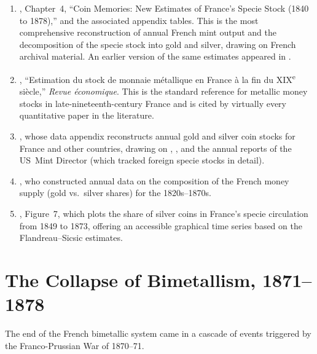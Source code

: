 \documentclass[12pt,letterpaper]{article}
\begin{document}
\begin{enumerate}
  \item \textbf{\citet{flandreau2004}}, Chapter~4, ``Coin Memories: New Estimates
  of France's Specie Stock (1840 to 1878),'' and the associated appendix tables.
  This is the most comprehensive reconstruction of annual French mint output and
  the decomposition of the specie stock into gold and silver, drawing on French
  archival material.  An earlier version of the same estimates appeared in
  \citet{flandreau1995}.

  \item \textbf{\citet{sicsic1989}}, ``Estimation du stock de monnaie m\'etallique
  en France \`a la fin du XIX\textsuperscript{e} si\`ecle,'' \textit{Revue
  \'economique}.  This is the standard reference for metallic money stocks in
  late-nineteenth-century France and is cited by virtually every quantitative
  paper in the literature.

  \item \textbf{\citet{velde_weber2000}}, whose data appendix reconstructs annual
  gold and silver coin stocks for France and other countries, drawing on
  \citet{sicsic1989}, \citet{flandreau1995}, and the annual reports of the
  US~Mint Director (which tracked foreign specie stocks in detail).

  \item \textbf{\citet{oppers1996}}, who constructed annual data on the composition
  of the French money supply (gold vs.\ silver shares) for the 1820s--1870s.

  \item \textbf{\citet{wiegand2022}}, Figure~7, which plots the share of silver
  coins in France's specie circulation from 1849 to 1873, offering an accessible
  graphical time series based on the Flandreau--Sicsic estimates.
\end{enumerate}

\section{The Collapse of Bimetallism, 1871--1878}

The end of the French bimetallic system came in a cascade of events triggered by the
Franco-Prussian War of 1870--71.
\end{document}
